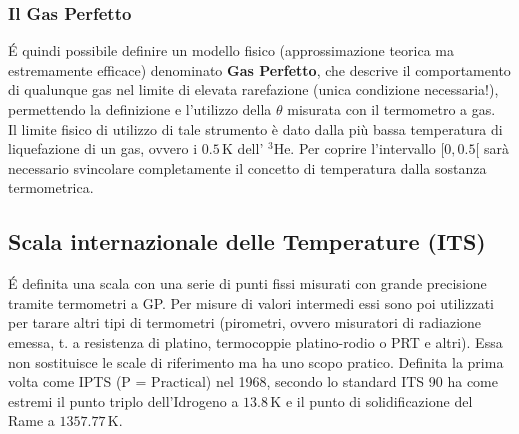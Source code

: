 \documentclass[10pt, oneside]{book}
\begin{document}
\subsubsection*{Il Gas Perfetto}
\'E quindi possibile definire un modello fisico (approssimazione teorica ma estremamente efficace) denominato \textbf{Gas Perfetto}, che descrive il comportamento di qualunque gas nel limite di elevata rarefazione (unica condizione necessaria!), permettendo la definizione e l'utilizzo della $\theta$ misurata con il termometro a gas. 
\\Il limite fisico di utilizzo di tale strumento è dato dalla più bassa temperatura di liquefazione di un gas, ovvero i $0.5 \, \mathrm{K}$ dell' $\mathrm{{}^3He}$. Per coprire l'intervallo $[0, 0.5[$ sarà necessario svincolare completamente il concetto di temperatura dalla sostanza termometrica.

\subsection{Scala internazionale delle Temperature (ITS)}
\'E definita una scala con una serie di punti fissi misurati con grande precisione tramite termometri a GP. Per misure di valori intermedi essi sono poi utilizzati per tarare altri tipi di termometri (pirometri, ovvero misuratori di radiazione emessa, t. a resistenza di platino, termocoppie platino-rodio o PRT e altri). Essa non sostituisce le scale di riferimento ma ha uno scopo pratico. Definita la prima volta come IPTS (P = Practical) nel 1968, secondo lo standard ITS 90 ha come estremi il punto triplo dell'Idrogeno a $13.8 \, \mathrm{K}$ e il punto di solidificazione del Rame a $1357.77 \, \mathrm{K}$.
\end{document}
